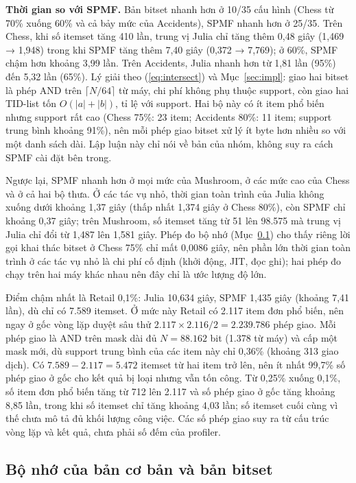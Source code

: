 \textbf{Thời gian so với SPMF.} Bản bitset nhanh hơn ở 10/35 cấu hình (Chess từ 70\% xuống 60\% và cả bảy mức
của Accidents), SPMF nhanh hơn ở 25/35. Trên Chess, khi số itemset tăng 410 lần, trung vị Julia chỉ tăng thêm
0,48 giây (1,469 → 1,948) trong khi SPMF tăng thêm 7,40 giây (0,372 → 7,769); ở 60\%, SPMF chậm hơn khoảng
3,99 lần. Trên Accidents, Julia nhanh hơn từ 1,81 lần (95\%) đến 5,32 lần (65\%). Lý giải theo
(\ref{eq:intersect}) và Mục~\ref{sec:impl}: giao hai bitset là phép AND trên $\lceil N/64 \rceil$ từ máy, chi
phí không phụ thuộc support, còn giao hai TID-list tốn $O(|a| + |b|)$, tỉ lệ với support. Hai bộ này có ít item
phổ biến nhưng support rất cao (Chess 75\%: 23 item; Accidents 80\%: 11 item; support trung bình khoảng 91\%),
nên mỗi phép giao bitset xử lý ít byte hơn nhiều so với một danh sách dài. Lập luận này chỉ nói về bản của
nhóm, không suy ra cách SPMF cài đặt bên trong.

Ngược lại, SPMF nhanh hơn ở mọi mức của Mushroom, ở các mức cao của Chess và ở cả hai bộ thưa. Ở các tác vụ nhỏ,
thời gian toàn trình của Julia không xuống dưới khoảng 1,37 giây (thấp nhất 1,374 giây ở Chess 80\%), còn
SPMF chỉ khoảng 0,37 giây; trên Mushroom, số itemset tăng từ 51 lên 98.575 mà trung vị Julia chỉ đổi từ 1,487
lên 1,581 giây. Phép đo bộ nhớ (Mục~\ref{sec:eval-mem}) cho thấy riêng lời gọi khai thác bitset ở Chess 75\% chỉ
mất 0,0086 giây, nên phần lớn thời gian toàn trình ở các tác vụ nhỏ là chi phí cố định (khởi động, JIT, đọc
ghi); hai phép đo chạy trên hai máy khác nhau nên đây chỉ là ước lượng độ lớn.

Điểm chậm nhất là Retail 0,1\%: Julia 10,634 giây, SPMF 1,435 giây (khoảng 7,41 lần), dù chỉ có 7.589
itemset. Ở mức này Retail có 2.117 item đơn phổ biến, nên ngay ở gốc vòng lặp duyệt sâu thử
$2.117 \times 2.116 / 2 = 2.239.786$ phép giao. Mỗi phép giao là AND trên mask dài đủ $N = 88.162$ bit (1.378 từ
máy) và cấp một mask mới, dù support trung bình của các item này chỉ 0,36\% (khoảng 313 giao dịch). Có
$7.589 - 2.117 = 5.472$ itemset từ hai item trở lên, nên ít nhất 99,7\% số phép giao ở gốc cho kết quả bị loại
nhưng vẫn tốn công. Từ 0,25\% xuống 0,1\%, số item đơn phổ biến tăng từ 712 lên 2.117 và số phép giao ở gốc tăng
khoảng 8,85 lần, trong khi số itemset chỉ tăng khoảng 4,03 lần; số itemset cuối cùng vì thế chưa mô tả đủ
khối lượng công việc. Các số phép giao suy ra từ cấu trúc vòng lặp và kết quả, chưa phải số đếm của profiler.

\subsection{Bộ nhớ của bản cơ bản và bản bitset}
\label{sec:eval-mem}

